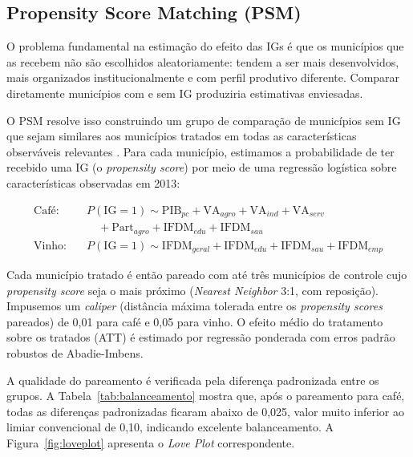 \documentclass[12pt, a4paper]{article}
\begin{document}
\subsection{Propensity Score Matching (PSM)}
\label{sec:psm}

O problema fundamental na estimação do efeito das IGs é que os municípios que as recebem não são escolhidos aleatoriamente: tendem a ser mais desenvolvidos, mais organizados institucionalmente e com perfil produtivo diferente. Comparar diretamente municípios com e sem IG produziria estimativas enviesadas.

O PSM resolve isso construindo um grupo de comparação de municípios sem IG que sejam similares aos municípios tratados em todas as características observáveis relevantes \citep{rosenbaum1983, caliendo2008}. Para cada município, estimamos a probabilidade de ter recebido uma IG (o \textit{propensity score}) por meio de uma regressão logística sobre características observadas em 2013:

\begin{align*}
\text{Café:} \quad  & P(\text{IG}=1) \sim \text{PIB}_{pc} + \text{VA}_{agro} + \text{VA}_{ind} + \text{VA}_{serv} \\
                    & \quad + \text{Part}_{agro} + \text{IFDM}_{edu} + \text{IFDM}_{sau} \\[4pt]
\text{Vinho:} \quad & P(\text{IG}=1) \sim \text{IFDM}_{geral} + \text{IFDM}_{edu} + \text{IFDM}_{sau} + \text{IFDM}_{emp}
\end{align*}

Cada município tratado é então pareado com até três municípios de controle cujo \textit{propensity score} seja o mais próximo (\textit{Nearest Neighbor} 3:1, com reposição). Impusemos um \textit{caliper} (distância máxima tolerada entre os \textit{propensity scores} pareados) de 0,01 para café e 0,05 para vinho. O efeito médio do tratamento sobre os tratados (ATT) é estimado por regressão ponderada com erros padrão robustos de Abadie-Imbens.

A qualidade do pareamento é verificada pela diferença padronizada entre os grupos. A Tabela~\ref{tab:balanceamento} mostra que, após o pareamento para café, todas as diferenças padronizadas ficaram abaixo de 0,025, valor muito inferior ao limiar convencional de 0,10, indicando excelente balanceamento. A Figura~\ref{fig:loveplot} apresenta o \textit{Love Plot} correspondente.
\end{document}

